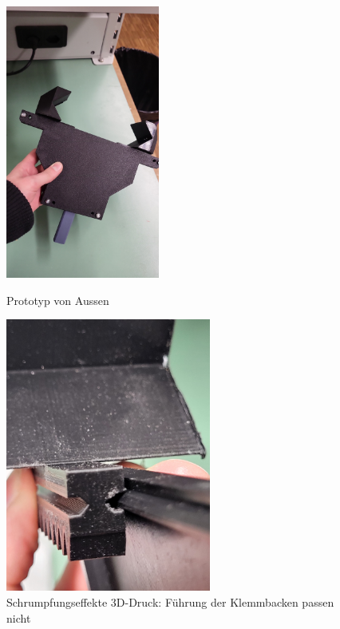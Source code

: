 \documentclass[../main.tex]{subfiles}
\begin{document}
\begin{figure}[H]
    \centering
    \begin{minipage}[t]{0.45\textwidth}
        \centering
        \includegraphics[height=9cm]{img/greifarmtest/prototyp_test_fertig.jpeg}
        \caption{Prototyp von Aussen}
        \label{fig:hardware_test_fertig}
    \end{minipage}%
    \hfill
    \begin{minipage}[t]{0.45\textwidth}
        \centering
        \includegraphics[height=9cm]{img/greifarmtest/prototyp_test_klemmen_gleiten.jpeg}
        \caption{Schrumpfungseffekte 3D-Druck: Führung der Klemmbacken passen nicht}
        \label{fig:hardware_test_klemmen_gleiten}
    \end{minipage}
\end{figure}
\end{document}
